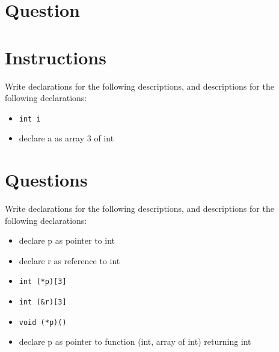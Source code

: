 \newpage


\section{Question}

\section*{Instructions}

{
  \long{}
  Write declarations for the following descriptions, and descriptions for the
  following declarations:
  \begin{itemize}
    \item \texttt{int i}
    \item declare a as array 3 of int
  \end{itemize}
}

\section*{Questions}

Write declarations for the following descriptions, and descriptions for the
following declarations:
\begin{itemize}

  \item declare p as pointer to int
    \vfill

  \item declare r as reference to int
    \vfill

  \item \texttt{int (*p)[3]}
    \vfill

  \item \texttt{int (&r)[3]}
    \vfill

  \item \texttt{void (*p)()}
    \vfill

  \item declare p as pointer to function (int, array of int) returning int
    \vfill

\end{itemize}

\newpage

